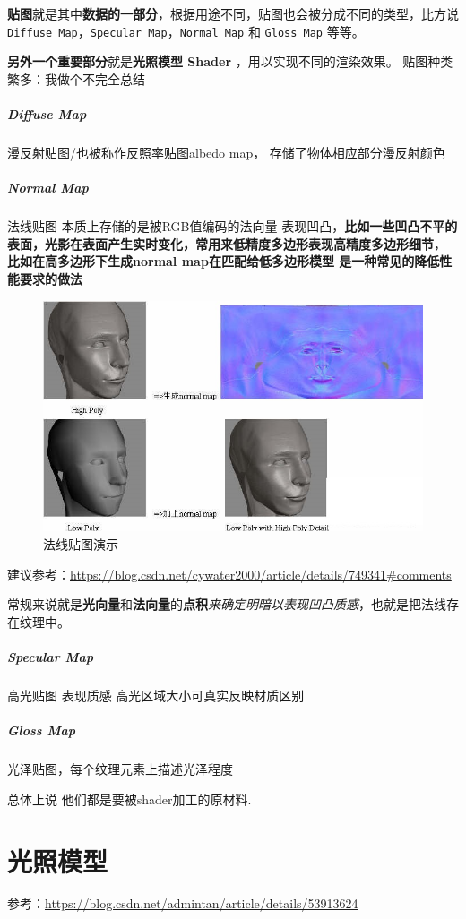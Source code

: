 \documentclass[UTF8,a4paper,12pt]{ctexbook}
\begin{document}
				\textbf{贴图}就是其中\textbf{数据的一部分}，根据用途不同，贴图也会被分成不同的类型，比方说 \verb|Diffuse Map|，\verb|Specular Map|，\verb|Normal Map| 和 \verb|Gloss Map| 等等。
				
				\textbf{另外一个重要部分}就是\textbf{光照模型 Shader} ，用以实现不同的渲染效果。 贴图种类繁多：我做个不完全总结
				
				\subparagraph{Diffuse Map}
					漫反射贴图/也被称作反照率贴图albedo map， 存储了物体相应部分漫反射颜色
					
				\subparagraph{Normal Map}
					法线贴图 本质上存储的是被RGB值编码的法向量 表现凹凸，\textbf{比如一些凹凸不平的表面，光影在表面产生实时变化，常用来低精度多边形表现高精度多边形细节}， \textbf{比如在高多边形下生成normal map在匹配给低多边形模型 是一种常见的降低性能要求的做法}
					
					\begin{figure}[H]
						\centering
						\includegraphics[scale=0.8]{normalMap}
						\caption{法线贴图演示}
					\end{figure}
					
					建议参考：\url{https://blog.csdn.net/cywater2000/article/details/749341#comments}
					
					常规来说就是\textbf{光向量}和\textbf{法向量}的\textbf{点积}\textit{来确定明暗以表现凹凸质感}，也就是把法线存在纹理中。
				\subparagraph{Specular Map}
					高光贴图 表现质感 高光区域大小可真实反映材质区别
					
				\subparagraph{Gloss Map}
					光泽贴图，每个纹理元素上描述光泽程度
					
			总体上说 他们都是要被shader加工的原材料.
	
	\section{光照模型}
		参考：\url{https://blog.csdn.net/admintan/article/details/53913624}
		
\end{document}
